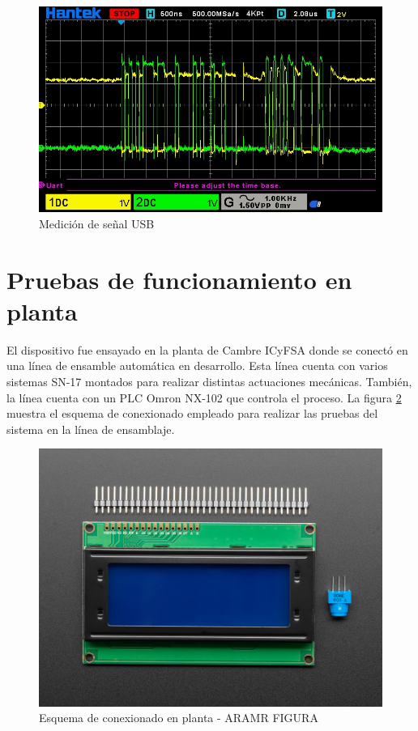 \begin{figure}[htbp]
	\centering
	\includegraphics[scale=0.6]{./Figures/msg_usb.jpeg}
	\caption{Medición de señal USB}
	\label{fig:signal_usb}
\end{figure}

\section{Pruebas de funcionamiento en planta}

El dispositivo fue ensayado en la planta de Cambre ICyFSA donde se conectó en una línea de ensamble automática en desarrollo. Esta línea cuenta con varios sistemas SN-17 montados para realizar distintas actuaciones mecánicas. También, la línea cuenta con un PLC Omron NX-102 que controla el proceso. La figura \ref{fig:esquema_conexion_planta} muestra el esquema de conexionado empleado para realizar las pruebas del sistema en la línea de ensamblaje.

\begin{figure}[htbp]
	\centering
	\includegraphics[scale=1]{./Figures/LCD.jpg}
	\caption{Esquema de conexionado en planta - ARAMR FIGURA}
	\label{fig:esquema_conexion_planta}
\end{figure}

